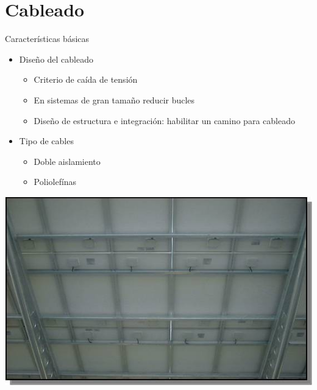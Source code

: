 \documentclass[xcolor={usenames,svgnames,dvipsnames}]{beamer}
\begin{document}
\section{Cableado}
\label{sec:org52a8943}

\begin{frame}[label={sec:org4b2c875}]{Características básicas}
\begin{itemize}
\item Diseño del cableado

\begin{itemize}
\item Criterio de caída de tensión

\item En sistemas de gran tamaño reducir bucles

\item Diseño de estructura e integración: habilitar un camino para
cableado
\end{itemize}

\item Tipo de cables

\begin{itemize}
\item Doble aislamiento

\item Poliolefínas
\end{itemize}
\end{itemize}
\begin{center}
\includegraphics[height=0.5\textheight]{../figs/PhotocampaCableado.jpg}
\end{center}
\end{frame}
\end{document}
